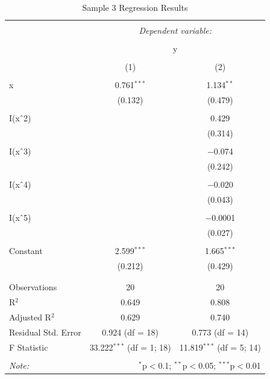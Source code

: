 \documentclass{article}
\begin{document}
\begin{table}[!htbp] \centering 
  \caption{Sample 3 Regression Results} 
  \label{} 
\begin{tabular}{@{\extracolsep{5pt}}lcc} 
\\[-1.8ex]\hline 
\hline \\[-1.8ex] 
 & \multicolumn{2}{c}{\textit{Dependent variable:}} \\ 
\cline{2-3} 
\\[-1.8ex] & \multicolumn{2}{c}{y} \\ 
\\[-1.8ex] & (1) & (2)\\ 
\hline \\[-1.8ex] 
 x & 0.761$^{***}$ & 1.134$^{**}$ \\ 
  & (0.132) & (0.479) \\ 
  & & \\ 
 I(x$\hat{\mkern6mu}$2) &  & 0.429 \\ 
  &  & (0.314) \\ 
  & & \\ 
 I(x$\hat{\mkern6mu}$3) &  & $-$0.074 \\ 
  &  & (0.242) \\ 
  & & \\ 
 I(x$\hat{\mkern6mu}$4) &  & $-$0.020 \\ 
  &  & (0.043) \\ 
  & & \\ 
 I(x$\hat{\mkern6mu}$5) &  & $-$0.0001 \\ 
  &  & (0.027) \\ 
  & & \\ 
 Constant & 2.599$^{***}$ & 1.665$^{***}$ \\ 
  & (0.212) & (0.429) \\ 
  & & \\ 
\hline \\[-1.8ex] 
Observations & 20 & 20 \\ 
R$^{2}$ & 0.649 & 0.808 \\ 
Adjusted R$^{2}$ & 0.629 & 0.740 \\ 
Residual Std. Error & 0.924 (df = 18) & 0.773 (df = 14) \\ 
F Statistic & 33.222$^{***}$ (df = 1; 18) & 11.819$^{***}$ (df = 5; 14) \\ 
\hline 
\hline \\[-1.8ex] 
\textit{Note:}  & \multicolumn{2}{r}{$^{*}$p$<$0.1; $^{**}$p$<$0.05; $^{***}$p$<$0.01} \\ 
\end{tabular} 
\end{table} 
\end{document}
